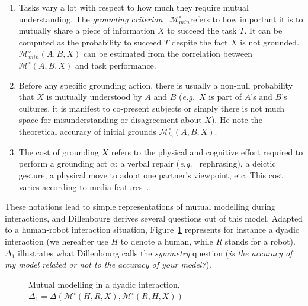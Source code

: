 \documentclass{sig-alternate}
\newcommand{\eg}{{\textit{e.g.~}}}
\newcommand{\Model}[3]{{$\mathcal{M}^{\circ}(#1, #2, #3)$}}
\newcommand{\groundingcriterion}{{$\mathcal{M}^{\circ}_{min}$}}
\begin{document}
\begin{enumerate}

    \item Tasks vary a lot with respect to how much they require mutual
        understanding.  The \emph{grounding criterion}~\cite{clark1986referring}
        \groundingcriterion refers to
        how important it is to mutually share a piece of information $X$ to
        succeed the task $T$. It can be computed as the probability to succeed $T$
        despite the fact $X$ is not grounded. $\mathcal{M}^{\circ}_{min}(A,B,X)$
        can be estimated from the correlation between \Model{A}{B}{X} and task
        performance. 

    \item Before any specific grounding action, there is usually a non-null
        probability that $X$ is mutually understood by $A$ and $B$ (\eg $X$
        is part of $A$'s and $B$'s cultures, it is manifest to co-present
        subjects or simply there is not much space for misunderstanding
        or disagreement about $X$). He note the theoretical accuracy of
        initial grounds $\mathcal{M}^{\circ}_{t_0}(A,B,X)$.

    \item The cost of grounding $X$ refers to the physical and cognitive effort
        required to perform a grounding act $\alpha$: a verbal repair (\eg
        rephrasing), a deictic gesture, a physical move to adopt one partner's
        viewpoint, etc. This cost varies according to media
        features~\cite{clark1991grounding}.

\end{enumerate}

These notations lead to simple representations of mutual modelling during
interactions, and Dillenbourg derives several questions out of this model.
Adapted to a human-robot interaction situation, Figure~\ref{mm_symmetry}
represents for instance a dyadic interaction (we hereafter use $H$ to denote a
human, while $R$ stands for a robot). $\Delta_1$ illustrates what Dillenbourg
calls the \emph{symmetry} question ({\it is the accuracy of my model related or
not to the accuracy of your model?}).

\begin{figure}[htb]
\centering


\caption{\small Mutual modelling in a dyadic interaction, $\Delta_1 =
    \Delta(\mathcal{M}^{\circ} (H,R,X),
\mathcal{M}^{\circ} (R,H,X))$}

\label{mm_symmetry}
\end{figure}
\end{document}
